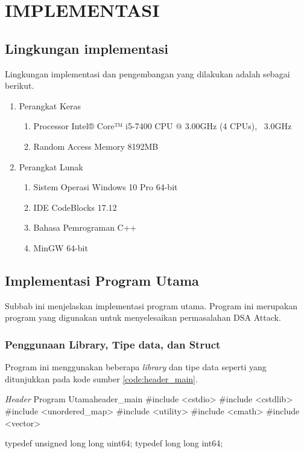 \chapter {IMPLEMENTASI}

\section{Lingkungan implementasi}

Lingkungan implementasi dan pengembangan yang dilakukan adalah sebagai berikut.
\begin{enumerate}
	\item Perangkat Keras
	\begin{enumerate}
		\item Processor Intel® Core™ i5-7400 CPU @ 3.00GHz (4 CPUs), ~3.0GHz
		\item Random Access Memory 8192MB
	\end{enumerate}
	\item Perangkat Lunak
	\begin{enumerate}
		\item Sistem Operasi Windows 10 Pro 64-bit
		\item IDE CodeBlocks 17.12
		\item Bahasa Pemrograman C++
		\item MinGW 64-bit
	\end{enumerate}
\end{enumerate}

\section{Implementasi Program Utama}

Subbab ini menjelaskan implementasi program utama. Program ini merupakan program yang digunakan untuk menyelesaikan permasalahan DSA Attack.

\subsection{Penggunaan Library, Tipe data, dan Struct}

Program ini menggunakan beberapa \textit{library} dan tipe data seperti yang ditunjukkan pada kode sumber \ref{code:header_main}.

\begin{code}[firstnumber=1,float]{\textit{Header} Program Utama}{header_main}
#include <cstdio>
#include <cstdlib>
#include <unordered_map>
#include <utility>
#include <cmath>
#include <vector>

typedef unsigned long long uint64;
typedef          long long int64;
\end{code}

